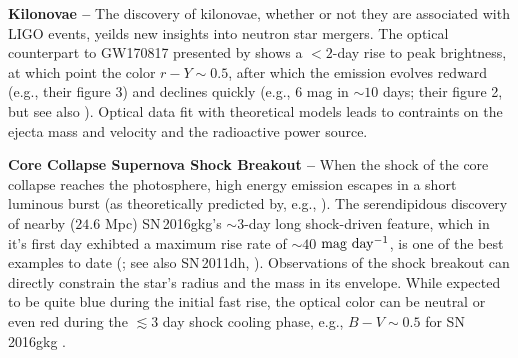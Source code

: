 \documentclass[11pt]{article}
\begin{document}
{\bf Kilonovae --} The discovery of kilonovae, whether or not they are associated with LIGO events, yeilds new insights into neutron star mergers. The optical counterpart to GW170817 presented by \cite{2017ApJ...848L..27T} shows a $<2$-day rise to peak brightness, at which point the color $r-Y\sim0.5$, after which the emission evolves redward (e.g., their figure 3) and declines quickly (e.g., $6$ mag in $\sim10$ days; their figure 2, but see also \cite{2017Natur.551...75S}). Optical data fit with theoretical models leads to contraints on the ejecta mass and velocity and the radioactive power source.

{\bf Core Collapse Supernova Shock Breakout --} When the shock of the core collapse reaches the photosphere, high energy emission escapes in a short luminous burst (as theoretically predicted by, e.g., \citealt{1978ApJ...223L.109K}). The serendipidous discovery of nearby ($24.6$ Mpc) SN\,2016gkg's $\sim3$-day long shock-driven feature, which in it's first day exhibted a maximum rise rate of $\sim40$ $\rm mag\ day^{-1}$, is one of the best examples to date (\citealt{2018Natur.554..497B}; see also SN\,2011dh, \citealt{2011ApJ...742L..18A}). Observations of the shock breakout can directly constrain the star's radius and the mass in its envelope. While expected to be quite blue during the initial fast rise, the optical color can be neutral or even red during the $\lesssim 3$ day shock cooling phase, e.g., $B-V\sim0.5$ for SN\,2016gkg \citep[see their extended data table 3][]{2018Natur.554..497B}.
\end{document}

